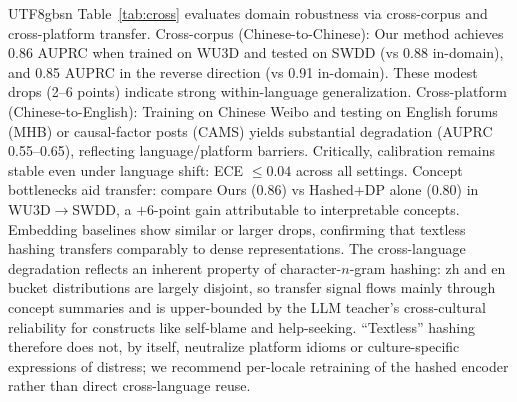 \documentclass[lettersize,journal]{IEEEtran}
\begin{document}
\begin{CJK*}{UTF8}{gbsn}
Table~\ref{tab:cross} evaluates domain robustness via cross-corpus and cross-platform transfer. Cross-corpus (Chinese-to-Chinese): Our method achieves 0.86 AUPRC when trained on WU3D and tested on SWDD (vs 0.88 in-domain), and 0.85 AUPRC in the reverse direction (vs 0.91 in-domain). These modest drops (2--6 points) indicate strong within-language generalization. Cross-platform (Chinese-to-English): Training on Chinese Weibo and testing on English forums (MHB) or causal-factor posts (CAMS) yields substantial degradation (AUPRC 0.55--0.65), reflecting language/platform barriers. Critically, calibration remains stable even under language shift: ECE ${\le}0.04$ across all settings. Concept bottlenecks aid transfer: compare Ours (0.86) vs Hashed+DP alone (0.80) in WU3D$\to$SWDD, a $+$6-point gain attributable to interpretable concepts. Embedding baselines show similar or larger drops, confirming that textless hashing transfers comparably to dense representations. The cross-language degradation reflects an inherent property of character-$n$-gram hashing: zh and en bucket distributions are largely disjoint, so transfer signal flows mainly through concept summaries and is upper-bounded by the LLM teacher's cross-cultural reliability for constructs like self-blame and help-seeking. ``Textless'' hashing therefore does not, by itself, neutralize platform idioms or culture-specific expressions of distress; we recommend per-locale retraining of the hashed encoder rather than direct cross-language reuse.


\end{CJK*}
\end{document}
